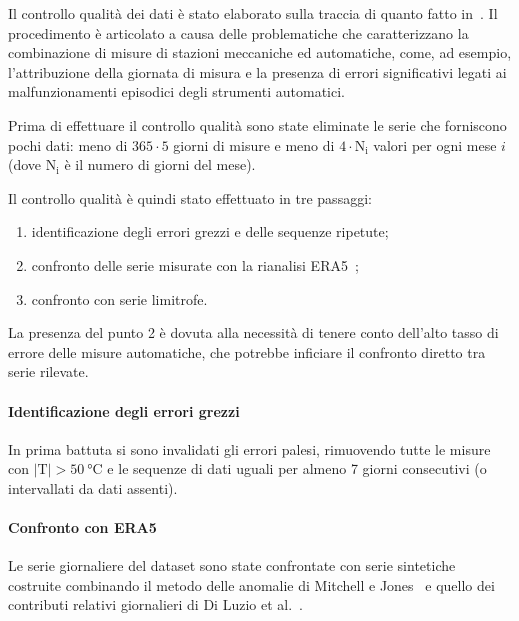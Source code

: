 Il controllo qualità dei dati è stato elaborato sulla traccia di quanto fatto in~\cite{brunettiHighresolutionTemperatureClimatology2014}. Il procedimento è articolato a causa delle problematiche che caratterizzano la combinazione di misure di stazioni meccaniche ed automatiche, come, ad esempio, l'attribuzione della giornata di misura e la presenza di errori significativi legati ai malfunzionamenti episodici degli strumenti automatici.

Prima di effettuare il controllo qualità sono state eliminate le serie che forniscono pochi dati: meno di \(365 \cdot 5\) giorni di misure e meno di \(4 \cdot \mathrm{N_i}\) valori per ogni mese \(i\) (dove \(\mathrm{N_i}\) è il numero di giorni del mese).

Il controllo qualità è quindi stato effettuato in tre passaggi:
\begin{enumerate}
  \item identificazione degli errori grezzi e delle sequenze ripetute;
  \item confronto delle serie misurate con la rianalisi ERA5~\cite{hersbachERA5GlobalReanalysis2020};
  \item confronto con serie limitrofe.
\end{enumerate}

La presenza del punto 2 è dovuta alla necessità di tenere conto dell'alto tasso di errore delle misure automatiche, che potrebbe inficiare il confronto diretto tra serie rilevate.

\paragraph{Identificazione degli errori grezzi}
In prima battuta si sono invalidati gli errori palesi, rimuovendo tutte le misure con \(\lvert \mathrm{T} \rvert > \qty{50}{\degreeCelsius}\) e le sequenze di dati uguali per almeno 7 giorni consecutivi (o intervallati da dati assenti).

\paragraph{Confronto con ERA5}
Le serie giornaliere del dataset sono state confrontate con serie sintetiche costruite combinando il metodo delle anomalie di Mitchell e Jones~\cite{mitchellImprovedMethodConstructing2005} e quello dei contributi relativi giornalieri di Di Luzio et al.~\cite{diluzioConstructingRetrospectiveGridded2008}.

